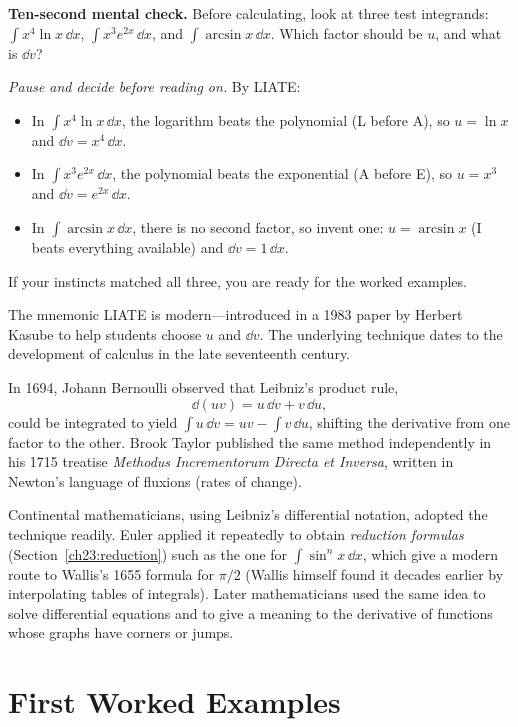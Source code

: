 \begin{recoverybox}
\textbf{Ten-second mental check.} Before calculating, look at three test integrands:
$\int x^4 \ln x\,\dd x$, $\int x^3 e^{2x}\,\dd x$, and $\int \arcsin x\,\dd x$. Which
factor should be $u$, and what is $\dd v$?

\emph{Pause and decide before reading on.}
By LIATE:
\begin{itemize}
\item In $\int x^4 \ln x\,\dd x$, the logarithm beats the polynomial (L before A), so $u = \ln x$ and $\dd v = x^4\,\dd x$.
\item In $\int x^3 e^{2x}\,\dd x$, the polynomial beats the exponential (A before E), so $u = x^3$ and $\dd v = e^{2x}\,\dd x$.
\item In $\int \arcsin x\,\dd x$, there is no second factor, so invent one: $u = \arcsin x$ (I beats everything available) and $\dd v = 1\,\dd x$.
\end{itemize}
If your instincts matched all three, you are ready for the worked examples.
\end{recoverybox}

\begin{historybox}
The mnemonic LIATE is modern---introduced in a 1983 paper by Herbert Kasube to help
students choose $u$ and $\dd v$. The underlying technique dates to the development of
calculus in the late seventeenth century.

In 1694, Johann Bernoulli observed that Leibniz's product rule,
\[
  \dd(uv) = u\,\dd v + v\,\dd u,
\]
could be integrated to yield $\int u\,\dd v = uv - \int v\,\dd u$, shifting the derivative
from one factor to the other. Brook Taylor published the same method independently in
his 1715 treatise \emph{Methodus Incrementorum Directa et Inversa}, written in
Newton's language of fluxions (rates of change).

Continental mathematicians, using Leibniz's differential notation, adopted the technique
readily. Euler applied it repeatedly to obtain \emph{reduction formulas}
(Section~\ref{ch23:reduction}) such as the one for
$\int \sin^n x\,\dd x$, which give a modern route to Wallis's 1655 formula for $\pi/2$
(Wallis himself found it decades earlier by interpolating tables of integrals). Later
mathematicians used the same idea to solve differential equations and to give a
meaning to the derivative of functions whose graphs have corners or jumps.
\end{historybox}

\section{First Worked Examples}
\label{ch23:examples}

